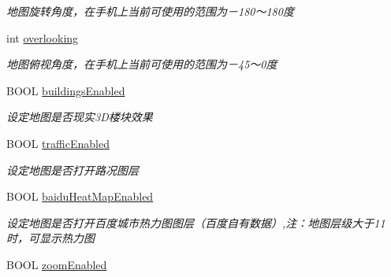 \begin{DoxyCompactItemize}
\begin{DoxyCompactList}\small\item\em 地图旋转角度，在手机上当前可使用的范围为－180～180度 \end{DoxyCompactList}\item 
\hypertarget{interface_b_m_k_map_view_a8ae6f6cf221ea4f14923150d8974f997}{int \hyperlink{interface_b_m_k_map_view_a8ae6f6cf221ea4f14923150d8974f997}{overlooking}}\label{interface_b_m_k_map_view_a8ae6f6cf221ea4f14923150d8974f997}

\begin{DoxyCompactList}\small\item\em 地图俯视角度，在手机上当前可使用的范围为－45～0度 \end{DoxyCompactList}\item 
\hypertarget{interface_b_m_k_map_view_abccbae8b8f7182769b8e0b69a4383ceb}{B\+O\+O\+L \hyperlink{interface_b_m_k_map_view_abccbae8b8f7182769b8e0b69a4383ceb}{buildings\+Enabled}}\label{interface_b_m_k_map_view_abccbae8b8f7182769b8e0b69a4383ceb}

\begin{DoxyCompactList}\small\item\em 设定地图是否现实3\+D楼块效果 \end{DoxyCompactList}\item 
\hypertarget{interface_b_m_k_map_view_a513d0877fb66681b10ad7a4ed1346cb7}{B\+O\+O\+L \hyperlink{interface_b_m_k_map_view_a513d0877fb66681b10ad7a4ed1346cb7}{traffic\+Enabled}}\label{interface_b_m_k_map_view_a513d0877fb66681b10ad7a4ed1346cb7}

\begin{DoxyCompactList}\small\item\em 设定地图是否打开路况图层 \end{DoxyCompactList}\item 
\hypertarget{interface_b_m_k_map_view_a9bc2c71421081064f9dbbd2a656172ff}{B\+O\+O\+L \hyperlink{interface_b_m_k_map_view_a9bc2c71421081064f9dbbd2a656172ff}{baidu\+Heat\+Map\+Enabled}}\label{interface_b_m_k_map_view_a9bc2c71421081064f9dbbd2a656172ff}

\begin{DoxyCompactList}\small\item\em 设定地图是否打开百度城市热力图图层（百度自有数据）,注：地图层级大于11时，可显示热力图 \end{DoxyCompactList}\item 
\hypertarget{interface_b_m_k_map_view_acf8472da994b76cef21a40673a41f774}{B\+O\+O\+L \hyperlink{interface_b_m_k_map_view_acf8472da994b76cef21a40673a41f774}{zoom\+Enabled}}\label{interface_b_m_k_map_view_acf8472da994b76cef21a40673a41f774}


\end{DoxyCompactItemize}

